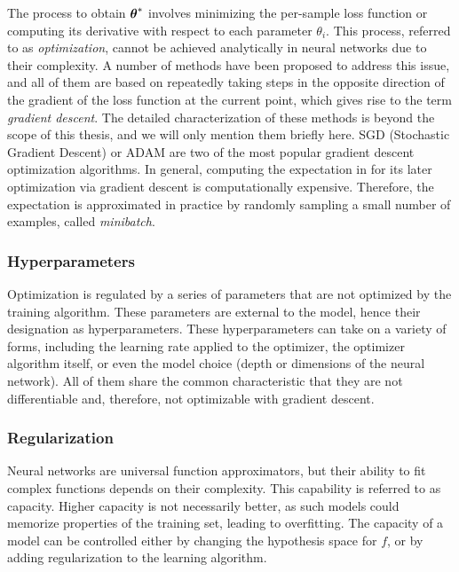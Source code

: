 The process to obtain $\boldsymbol{\theta}^*$ involves minimizing the per-sample loss function or computing its derivative with respect to each parameter $\theta_i$. This process, referred to as \textit{optimization}, cannot be achieved analytically in neural networks due to their complexity. A number of methods have been proposed to address this issue, and all of them are based on repeatedly taking steps in the opposite direction of the gradient of the loss function at the current point, which gives rise to the term \textit{gradient descent}. The detailed characterization of these methods is beyond the scope of this thesis, and we will only mention them briefly here. SGD (Stochastic Gradient Descent) or ADAM are two of the most popular gradient descent optimization algorithms. In general, computing the expectation in  for its later optimization via gradient descent is computationally expensive. Therefore, the expectation is approximated in practice by randomly sampling a small number of examples, called \textit{minibatch}. 

\subsubsection{Hyperparameters}
Optimization is regulated by a series of parameters that are not optimized by the training algorithm. These parameters are external to the model, hence their designation as hyperparameters. These hyperparameters can take on a variety of forms, including the learning rate applied to the optimizer, the optimizer algorithm itself, or even the model choice (depth or dimensions of the neural network). All of them share the common characteristic that they are not differentiable and, therefore, not optimizable with gradient descent.

\subsubsection{Regularization}
Neural networks are universal function approximators, but their ability to fit complex functions depends on their complexity. This capability is referred to as capacity. Higher capacity is not necessarily better, as such models could memorize properties of the training set, leading to overfitting. The capacity of a model can be controlled either by changing the hypothesis space for $f$, or by adding regularization to the learning algorithm.

